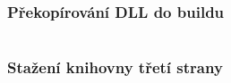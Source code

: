 \begin{frame}[fragile]
\frametitle{Překopírování DLL do buildu}
{\fontsize{3.7}{3.7}\inputminted[frame=lines]{cmake}{../examples/09-CopyDll/CMakeLists.txt}}
\end{frame}

\begin{frame}[fragile]
\frametitle{Stažení knihovny třetí strany}
{\fontsize{5}{5}\inputminted[frame=lines]{cmake}{../examples/10-Download/CMakeLists.txt}}
\end{frame}


